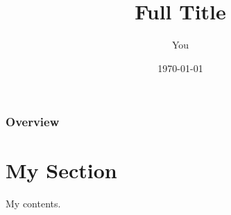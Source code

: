 \documentclass{beamer}
\title[Short Title]{Full Title}
\author{You}
\institute[Short Institution]{Full Institution \\ \medskip\textit{email}}
\date{\today}
\begin{document}
\begin{frame}
\titlepage
\end{frame}

\begin{frame}
\frametitle{Overview}
\tableofcontents
\end{frame}

\section{My Section}
\begin{frame}
My contents.
\end{frame}
\end{document}
